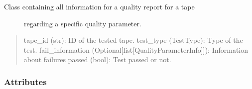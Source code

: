 \documentclass[letterpaper,10pt,english]{sphinxmanual}
\begin{document}
\begin{fulllineitems}
\label{\detokenize{generated/quality_assessment.data_types.QualityReport:quality_assessment.data_types.QualityReport}}\begin{description}
\item[{Class containing all information for a quality report for a tape}] \leavevmode
\sphinxAtStartPar
regarding a specific quality parameter.

\end{description}
\begin{quote}

\sphinxAtStartPar
tape\_id (str): ID of the tested tape.
test\_type (TestType): Type of the test.
fail\_information (Optional{[}list{[}QualityParameterInfo{]}{]}): Information about failures
passed (bool): Test passed or not.
\end{quote}
\subsubsection*{Attributes}


\begin{savenotes}\sphinxatlongtablestart\begin{longtable}[c]{}
\hline

\endfirsthead

%
{}\\
\hline

\endhead

\hline
{}\\
\endfoot


\end{longtable}
\end{savenotes}
\end{fulllineitems}
\end{document}
